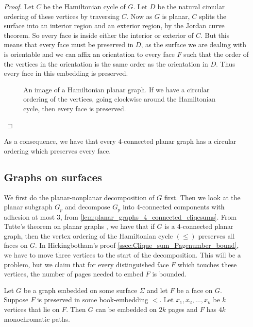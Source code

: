 \begin{proof}
	Let \(C\) be the Hamiltonian cycle of \(G\). Let \(D\) be the natural circular ordering of these vertices by traversing \(C\). Now as \(G\) is planar, \(C\) splits the surface into an interior region and an exterior region, by the Jordan curve theorem. So every face is inside either the interior or exterior of \(C\). But this means that every face must be preserved in \(D\), as the surface we are dealing with is orientable and we can affix an orientation to every face \(F\) such that the order of the vertices in the orientation is the same order as the orientation in \(D\). Thus every face in this embedding is preserved.
	\begin{figure}
		\centering
		
		\caption{An image of a Hamiltonian planar graph. If we have a circular ordering of the vertices, going clockwise around the Hamiltonian cycle, then every face is preserved.}\label{fig:hamiltonian_planar}
	\end{figure}
\end{proof}
As a consequence, we have that every 4-connected planar graph has a circular ordering which preserves every face.

\subsection{Graphs on surfaces}

We first do the planar-nonplanar decomposition of \(G\) first.
Then we look at the planar subgraph \(G_p\) and decompose \(G_p\) into 4-connected components with adhesion at most 3, from \cref{lem:planar_graphs_4_connected_cliqesums}.
From Tutte's theorem on planar graphs \cite{tutteTheoremPlanarGraphs1956}, we have that if \(G\) is a 4-connected planar graph, then the vertex ordering of the Hamiltonian cycle \((\leq)\) preserves all faces on \(G\).
In Hickingbotham's proof \cref{ssec:Clique_sum_Pagenumber_bound}, we have to move three vertices to the start of the decomposition. This will be a problem, but we claim that for every distinguished face \(F\) which touches these vertices, the number of pages needed to embed \(F\) is bounded.

\begin{theorem}\label{thm:embedded_graph}
	Let \( G \) be a graph embedded on some surface \(\Sigma \) and let \(F\) be a face on \(G\). Suppose \(F \) is preserved in some book-embedding \( < \). Let \(x_1, x_2, \ldots, x_k \) be \(k \) vertices that lie on \(F \). Then $G$ can be embedded on $2k$ pages and \(F\) has \( 4k \) monochromatic paths.
\end{theorem}

